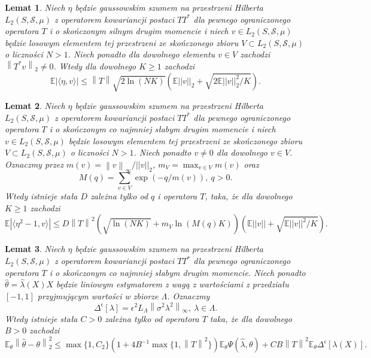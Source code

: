 \documentclass[man,mfiu]{mgrwms}
\newcommand{\norm}[1]{\left\lVert#1\right\rVert}
\newtheorem{lm}{Lemat}[chapter]
\begin{document}
\begin{lm}\label{lem4}
Niech $\eta$ będzie gaussowskim szumem na przestrzeni Hilberta $L_2(S,\mathcal{S},\mu)$ z operatorem kowariancji postaci $TT^*$ dla pewnego ograniczonego operatora $T$ i o skończonym silnym drugim momencie i niech $v\in L_2(S,\mathcal{S},\mu)$ będzie losowym elementem tej przestrzeni ze skończonego zbioru $V\subset L_2(S,\mathcal{S},\mu)$ o liczności $N>1$. Niech ponadto dla dowolnego elementu $v\in V$ zachodzi $\norm{T^*v}_2\neq 0$. Wtedy dla dowolnego $K\geq 1$ zachodzi
\begin{displaymath}
\mathbb{E}\left|\langle \eta, v\rangle\right|\leq \norm{T} \sqrt{2\ln (NK)}\left(\mathbb{E}||v||_2+\sqrt{2\mathbb{E}||v||_2^2/K}\right).
\end{displaymath}
\end{lm}

\begin{lm}\label{lem5}
Niech $\eta$ będzie gaussowskim  szumem na przestrzeni Hilberta $L_2(S,\mathcal{S},\mu)$ z operatorem kowariancji postaci $TT^*$ dla pewnego ograniczonego operatora $T$ i o skończonym co najmniej słabym drugim momencie i niech $v\in L_2(S,\mathcal{S},\mu)$ będzie losowym elementem tej przestrzeni ze skończonego zbioru $V\subset L_2(S,\mathcal{S},\mu)$ o liczności $N>1$. Niech ponadto $v\neq 0$ dla dowolnego $v\in V$. Oznaczmy przez $m(v)=\norm{v}_{\infty}/||v||_2$, $m_V=\max_{v\in V}m(v)$ oraz 
\begin{displaymath}
M(q)=\sum_{v\in V}\exp (-q/m(v)),\ q>0.
\end{displaymath}
Wtedy istnieje stała $D$ zależna tylko od $q$ i operatora $T$, taka, że dla dowolnego $K\geq 1$ zachodzi
\begin{displaymath}
\mathbb{E}\left|\langle \eta^2-1, v\rangle\right|\leq D\norm{T}^2\left(\sqrt{\ln (NK)}+m_V\ln (M(q)K)\right)\left(\mathbb{E}||v||+\sqrt{\mathbb{E}||v||^2/K}\right).
\end{displaymath}
\end{lm}
\begin{lm}\label{lem6}
Niech $\eta$ będzie gaussowskim  szumem na przestrzeni Hilberta $L_2(S,\mathcal{S},\mu)$ z operatorem kowariancji postaci $TT^*$ dla pewnego ograniczonego operatora $T$ i o skończonym co najmniej słabym drugim momencie. Niech ponadto $\hat{\theta}=\hat{\lambda}(X)X$ będzie liniowym estymatorem z wagą z wartościami z przedziału $[-1,1]$ przyjmującym wartości w zbiorze $\Lambda$. Oznaczmy  
\begin{displaymath}
\Delta^{\epsilon}[\lambda]=\epsilon^2L_{\Lambda}\norm{\sigma^2\lambda^2}_{\infty},\ \lambda\in \Lambda.
\end{displaymath}
Wtedy istnieje stała $C>0$ zależna tylko od operatora $T$ taka, że dla dowolnego $B>0$ zachodzi
\begin{displaymath}
\mathbb{E}_{\theta}\norm{\hat{\theta}-\theta}_2^2\leq \max\{1,C_2\}(1+4B^{-1}\max\{1,\norm{T}^2\})\mathbb{E}_{\theta}\Psi(\hat{\lambda},\theta)+CB\norm{T}^2\mathbb{E}_{\theta}\Delta^{\epsilon}[\lambda (X)].
\end{displaymath}
\end{lm}
\end{document}
